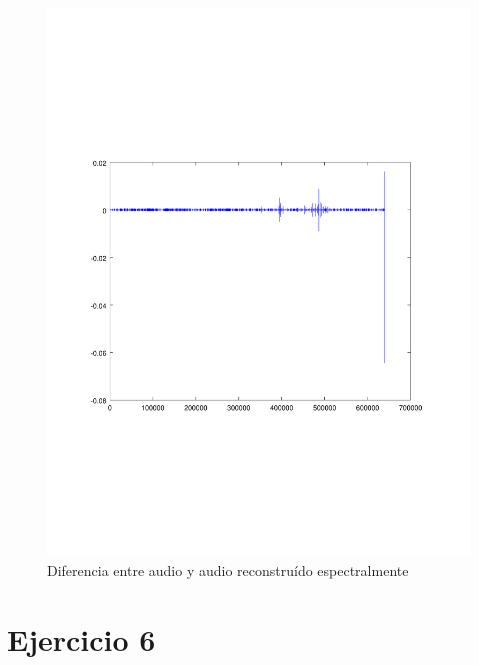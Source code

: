 \documentclass[paper=a4, fontsize=11pt]{scrartcl} %
\numberwithin{equation}{section} %
\numberwithin{figure}{section} %
\numberwithin{table}{section} %
\begin{document}
\begin{figure}[t!]
\includegraphics[width=\textwidth]{../images/difference_reconstruction_5.pdf}
\caption{Diferencia entre audio y audio reconstruído espectralmente}
\label{diff_audio_reconstruido}
\end{figure}


\section{Ejercicio 6}
\end{document}
